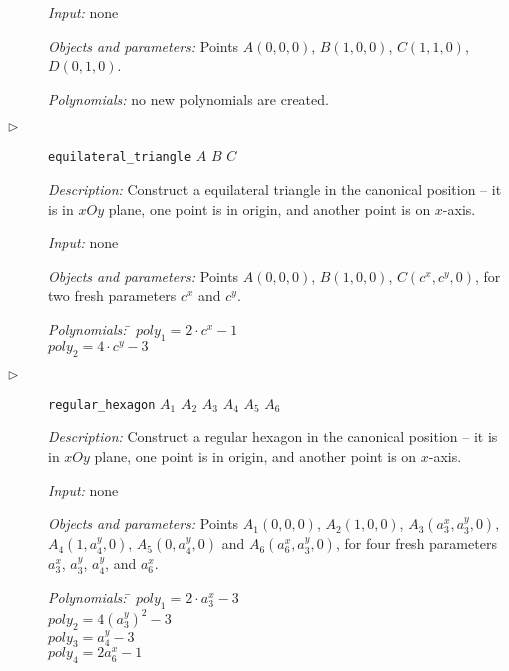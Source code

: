 \documentclass[final,1p,times,authoryear]{elsarticle}
\begin{document}
\begin{description}
  {\em Input:} none

  {\em Objects and parameters:} Points $A(0, 0, 0)$, $B(1, 0, 0)$,
  $C(1, 1, 0)$, $D(0, 1, 0)$.

\begin{tabbing}
{\em Polynomials:} no new polynomials are created.
\end{tabbing}


\item[$\triangleright$] {\tt equilateral\_triangle} $A$ $B$ $C$

  {\em Description:} Construct a equilateral triangle in the canonical
  position -- it is in $xOy$ plane, one point is in origin, and
  another point is on $x$-axis.
  
  {\em Input:} none

  {\em Objects and parameters:} Points $A(0, 0, 0)$, $B(1, 0, 0)$,
  $C(c^x, c^y, 0)$, for two fresh parameters $c^x$ and $c^y$.

\begin{tabbing}
{\em Polynomials:} \= $poly_1 = 2\cdot c^x - 1$ \\
                   \> $poly_2 = 4\cdot c^y - 3$
\end{tabbing}


\item[$\triangleright$] {\tt regular\_hexagon} $A_1$ $A_2$ $A_3$ $A_4$ $A_5$ $A_6$

  {\em Description:} Construct a regular hexagon in the canonical
  position -- it is in $xOy$ plane, one point is in origin, and
  another point is on $x$-axis. 
  
  {\em Input:} none

  {\em Objects and parameters:} Points $A_1(0, 0, 0)$, $A_2(1, 0, 0)$,
  $A_3(a_3^x, a_3^y, 0)$, $A_4(1, a_4^y, 0)$, $A_5(0, a_4^y, 0)$ and
  $A_6(a_6^x, a_3^y, 0)$, for four fresh parameters $a_3^x$, $a_3^y$,
  $a_4^y$, and $a_6^x$.

\begin{tabbing}
{\em Polynomials:} \= $poly_1 = 2\cdot a_3^x - 3$ \\
                   \> $poly_2 = 4(a_3^y)^2 - 3$ \\
                   \> $poly_3 = a_4^y - 3$ \\
                   \> $poly_4 = 2a_6^x - 1$
\end{tabbing}
\end{description}


\end{document}
